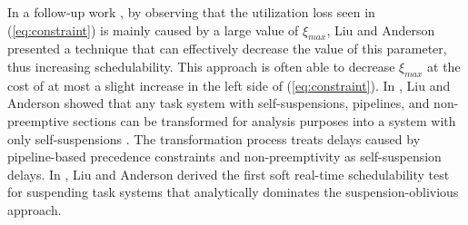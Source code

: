 In a follow-up work \cite{Liu5}, by observing that the utilization loss seen in (\ref{eq:constraint}) is mainly caused by a large value of $\xi_{max}$, Liu and Anderson presented a technique that can effectively decrease the value of this parameter, thus increasing schedulability. 
This approach is often able to decrease $\xi_{max}$ at the cost of at most a slight increase in the left side of (\ref{eq:constraint}). 
In \cite{Liu4}, Liu and Anderson  showed that any task system with self-suspensions, pipelines, and
non-preemptive sections can be transformed for analysis purposes into a system with only self-suspensions \cite{Liu4}. The transformation process treats delays caused by pipeline-based precedence constraints and non-preemptivity as self-suspension delays.
In \cite{Liu9,Liu11}, Liu and Anderson derived the first soft real-time schedulability test for suspending task systems that analytically dominates the suspension-oblivious approach.





  